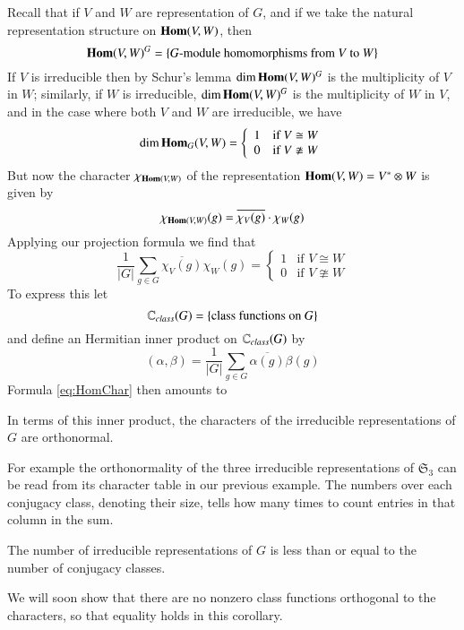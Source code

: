 Recall that if $V$ and $W$ are representation of $G$, and if we take the natural representation structure on $\mathbf{Hom}(V,W)$, then \begin{equation*}
    \mathbf{Hom}(V,W)^G = \{G\text{-module homomorphisms from $V$ to $W$}\}
\end{equation*}
If $V$ is irreducible then by Schur's lemma $\dim \mathbf{Hom}(V,W)^G$ is the multiplicity of $V$ in $W$; similarly, if $W$ is irreducible, $\dim \mathbf{Hom}(V,W)^G$ is the multiplicity of $W$ in $V$, and in the case where both $V$ and $W$ are irreducible, we have $$\dim\mathbf{Hom}_G(V,W) =\left\{\begin{array}{lc} 1 & \text{if }V\cong W \\ 0 & \text{if }V\ncong W\end{array}\right.$$
But now the character $\chi_{\mathbf{Hom}(V,W)}$ of the representation $\mathbf{Hom}(V,W) = V^*\otimes W$ is given by \begin{equation*}
    \chi_{\mathbf{Hom}(V,W)}(g) = \overline{\chi_V(g)}\cdot\chi_W(g)
\end{equation*}
Applying our projection formula we find that \begin{equation}\label{eq:HomChar}
    \frac{1}{|G|}\sum_{g \in G}\overline{\chi_V(g)}\chi_W(g) = \left\{\begin{array}{lc} 1 & \text{if }V\cong W \\ 0 & \text{if }V\ncong W\end{array}\right.
\end{equation}
To express this let $$\mathbb C_{class}(G) = \{\text{class functions on }G\}$$ and define an Hermitian inner product on $\mathbb C_{class}(G)$ by \begin{equation}\label{eq:classHerm}
    (\alpha,\beta) = \frac{1}{|G|}\sum_{g\in G}\overline{\alpha(g)}\beta(g)
\end{equation}
Formula \ref{eq:HomChar} then amounts to 

\begin{theorem}
    In terms of this inner product, the characters of the irreducible representations of $G$ are orthonormal.
\end{theorem}
For example the orthonormality of the three irreducible representations of $\mathfrak{S}_3$ can be read from its character table in our previous example. The numbers over each conjugacy class, denoting their size, tells how many times to count entries in that column in the sum.

\begin{corollary}
    The number of irreducible representations of $G$ is less than or equal to the number of conjugacy classes.
\end{corollary}
We will soon show that there are no nonzero class functions orthogonal to the characters, so that equality holds in this corollary.


